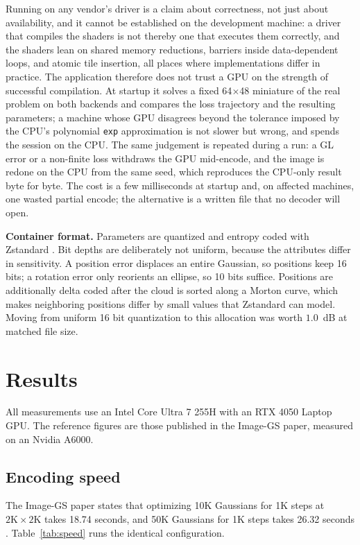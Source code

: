 \documentclass[11pt,a4paper]{article}
\begin{document}
Running on any vendor's driver is a claim about correctness, not just about availability, and it cannot be established on the development machine: a driver that compiles the shaders is not thereby one that executes them correctly, and the shaders lean on shared memory reductions, barriers inside data-dependent loops, and atomic tile insertion, all places where implementations differ in practice. The application therefore does not trust a GPU on the strength of successful compilation. At startup it solves a fixed 64$\times$48 miniature of the real problem on both backends and compares the loss trajectory and the resulting parameters; a machine whose GPU disagrees beyond the tolerance imposed by the CPU's polynomial \texttt{exp} approximation is not slower but wrong, and spends the session on the CPU. The same judgement is repeated during a run: a GL error or a non-finite loss withdraws the GPU mid-encode, and the image is redone on the CPU from the same seed, which reproduces the CPU-only result byte for byte. The cost is a few milliseconds at startup and, on affected machines, one wasted partial encode; the alternative is a written file that no decoder will open.

\textbf{Container format.} Parameters are quantized and entropy coded with Zstandard \cite{zstd}. Bit depths are deliberately not uniform, because the attributes differ in sensitivity. A position error displaces an entire Gaussian, so positions keep 16 bits; a rotation error only reorients an ellipse, so 10 bits suffice. Positions are additionally delta coded after the cloud is sorted along a Morton curve, which makes neighboring positions differ by small values that Zstandard can model. Moving from uniform 16 bit quantization to this allocation was worth $1.0$~dB at matched file size.

\newpage

\section{Results}

All measurements use an Intel Core Ultra 7 255H with an RTX 4050 Laptop GPU. The reference figures are those published in the Image-GS paper, measured on an Nvidia A6000.

\subsection{Encoding speed}

The Image-GS paper states that optimizing 10K Gaussians for 1K steps at $2\mathrm{K}\times2\mathrm{K}$ takes 18.74 seconds, and 50K Gaussians for 1K steps takes 26.32 seconds \cite{imagegs}. Table~\ref{tab:speed} runs the identical configuration.
\end{document}
